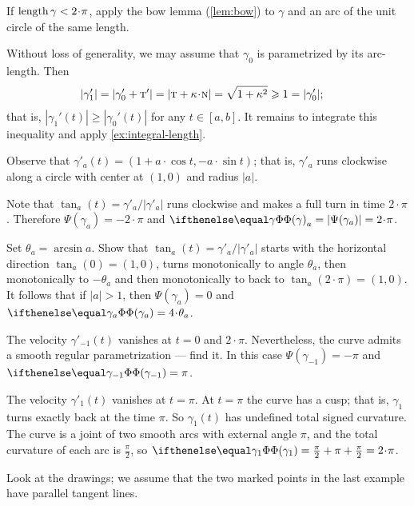  If $\length\gamma<2\cdot\pi$, apply the bow lemma (\ref{lem:bow}) to $\gamma$ and an arc of the unit circle of the same length.



\setcounter{eqtn}{0}



Without loss of generality, we may assume that $\gamma_0$ is parametrized by its arc-length.
Then
\begin{align*}
|\gamma_1'|&=|\gamma_0'+\tan'|=|\tan+\kur\cdot\norm|=
\sqrt{1+\kur^2}\ge
1=
|\gamma_0'|;
\end{align*}
that is, $|\gamma_1'(t)|\ge|\gamma_0'(t)|$ for any $t\in[a,b]$.
It remains to integrate this inequality and apply 
\ref{ex:integral-length}.


Observe that $\gamma'_a(t)=(1+a\cdot \cos t, -a\cdot \sin t)$;
that is, $\gamma'_a$ runs clockwise along a circle with center at $(1,0)$ and radius $\vert a \vert$.

 Note that $\tan_a(t)=\gamma'_a/|\gamma'_a|$ runs clockwise and makes a full turn in time $2\cdot\pi$.
Therefore $\Psi(\gamma_a)=-2\cdot\pi$ and $\tc\gamma_a=|\Psi(\gamma_a)|=2\cdot\pi$.

Set $\theta_a=\arcsin a$.
Show that $\tan_a(t)=\gamma'_a/|\gamma'_a|$ starts with the horizontal direction $\tan_a(0)=(1,0)$, turns monotonically to angle $\theta_a$, then monotonically to $-\theta_a$ and then monotonically to back to $\tan_a(2\cdot\pi)=(1,0)$.
It follows that if $|a|>1$, then
$\Psi(\gamma_a)=0$ and $\tc{\gamma_a}=4\cdot\theta_a$.

The velocity $\gamma'_{-1}(t)$ vanishes at $t=0$ and $2\cdot\pi$.
Nevertheless, the curve admits a smooth regular parametrization --- find it.
In this case $\Psi(\gamma_{-1})=-\pi$ and $\tc{\gamma_{-1}}=\pi$.

The velocity $\gamma'_1(t)$ vanishes at $t=\pi$.
At $t=\pi$ the curve has a cusp;
that is, $\gamma_1$ turns exactly back at the time $\pi$.
So $\gamma_1(t)$ has undefined total signed curvature.
The curve is a joint of two smooth arcs with external angle $\pi$, and
the total curvature of each arc is $\tfrac\pi2$, so 
$\tc{\gamma_{1}}=\tfrac\pi2+\pi+\tfrac\pi2=2\cdot\pi$.


Look at the drawings; we assume that the two marked points in the last example have parallel tangent lines.

